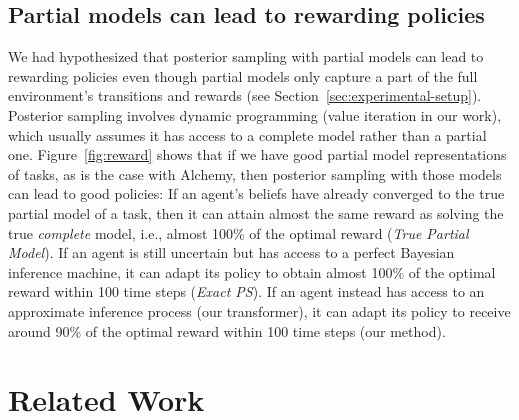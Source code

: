 \documentclass[sigconf]{aamas}
\begin{document}
\subsection{Partial models can lead to rewarding policies}
We had hypothesized that posterior sampling with partial models can lead to rewarding policies even though partial models only capture a part of the full environment's transitions and rewards (see Section~\ref{sec:experimental-setup}). Posterior sampling involves dynamic programming (value iteration in our work), which usually assumes it has access to a complete model rather than a partial one. Figure~\ref{fig:reward} shows that if we have good partial model representations of tasks, as is the case with Alchemy, then posterior sampling with those models can lead to good policies: If an agent's beliefs have already converged to the true partial model of a task, then it can attain almost the same reward as solving the true \textit{complete} model, i.e., almost 100\% of the optimal reward (\textit{True Partial Model}). If an agent is still uncertain but has access to a perfect Bayesian inference machine, it can adapt its policy to obtain almost 100\% of the optimal reward within 100 time steps (\textit{Exact PS}). If an agent instead has access to an approximate inference process (our transformer), it can adapt its policy to receive around 90\% of the optimal reward within 100 time steps (our method).
\section{Related Work}\label{sec:related}
\balance
\end{document}
